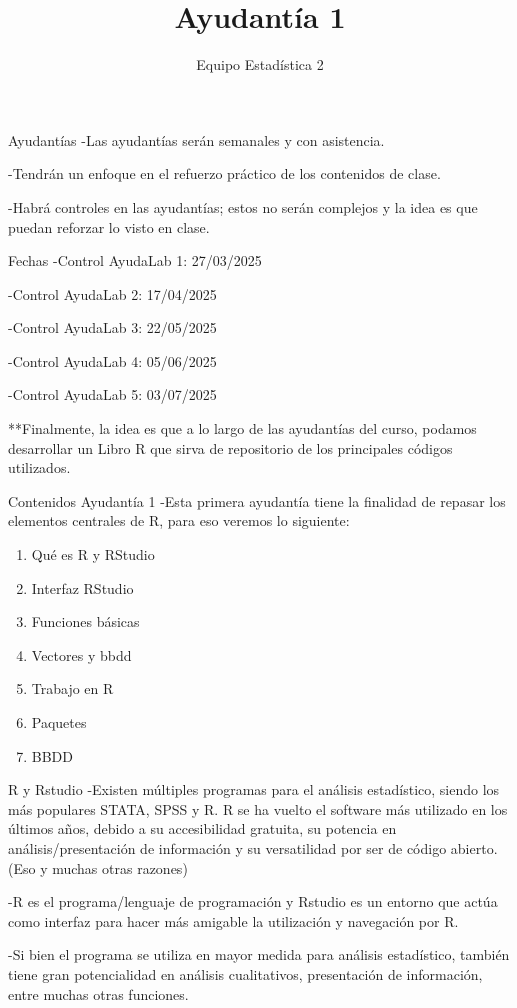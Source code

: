 \documentclass[
  30pt,
  ignorenonframetext,
]{beamer}
\title{Ayudantía 1}
\author{Equipo Estadística 2}
\date{}
\providecommand{\tightlist}{%
  \setlength{\itemsep}{0pt}\setlength{\parskip}{0pt}}\usepackage{longtable,booktabs,array}
\begin{document}
\frame{\titlepage}


\begin{frame}{Ayudantías}
\label{ayudantuxedas}
-Las ayudantías serán semanales y con asistencia.

-Tendrán un enfoque en el refuerzo práctico de los contenidos de clase.

-Habrá controles en las ayudantías; estos no serán complejos y la idea
es que puedan reforzar lo visto en clase.
\end{frame}

\begin{frame}{Fechas}
\label{fechas}
-Control AyudaLab 1: 27/03/2025

-Control AyudaLab 2: 17/04/2025

-Control AyudaLab 3: 22/05/2025

-Control AyudaLab 4: 05/06/2025

-Control AyudaLab 5: 03/07/2025

**Finalmente, la idea es que a lo largo de las ayudantías del curso,
podamos desarrollar un Libro R que sirva de repositorio de los
principales códigos utilizados.
\end{frame}

\begin{frame}{Contenidos Ayudantía 1}
\label{contenidos-ayudantuxeda-1}
-Esta primera ayudantía tiene la finalidad de repasar los elementos
centrales de R, para eso veremos lo siguiente:

\begin{enumerate}
\tightlist
\item
  Qué es R y RStudio
\item
  Interfaz RStudio
\item
  Funciones básicas
\item
  Vectores y bbdd
\item
  Trabajo en R
\item
  Paquetes
\item
  BBDD
\end{enumerate}
\end{frame}

\begin{frame}{R y Rstudio}
\label{r-y-rstudio}
-Existen múltiples programas para el análisis estadístico, siendo los
más populares STATA, SPSS y R. R se ha vuelto el software más utilizado
en los últimos años, debido a su accesibilidad gratuita, su potencia en
análisis/presentación de información y su versatilidad por ser de código
abierto. (Eso y muchas otras razones)

-R es el programa/lenguaje de programación y Rstudio es un entorno que
actúa como interfaz para hacer más amigable la utilización y navegación
por R.

-Si bien el programa se utiliza en mayor medida para análisis
estadístico, también tiene gran potencialidad en análisis cualitativos,
presentación de información, entre muchas otras funciones.
\end{frame}
\end{document}
